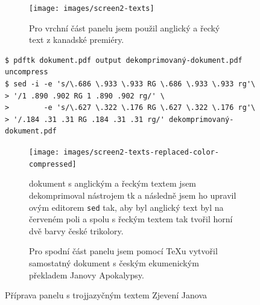 \begin{figure}[p]
\begin{subfigure}{\linewidth}
\centering
\texttt{[image: images/screen2-texts]}
\caption{Pro vrchní část panelu jsem použil anglický a řecký text z kanadské premiéry.~\cite{morland2018fantasia}}
\label{fig:screen2-texts-greek-and-english-original}
\end{subfigure}
\par\vspace{5pt}
\begingroup
\small
\begin{verbatim}
$ pdftk dokument.pdf output dekomprimovaný-dokument.pdf uncompress
$ sed -i -e 's/\.686 \.933 \.933 RG \.686 \.933 \.933 rg'\
> '/1 .890 .902 RG 1 .890 .902 rg/' \
>        -e 's/\.627 \.322 \.176 RG \.627 \.322 \.176 rg'\
> '/.184 .31 .31 RG .184 .31 .31 rg/' dekomprimovaný-dokument.pdf
\end{verbatim}
\endgroup
\par\vspace{2.5pt}
\begin{subfigure}{\linewidth}
\centering
\texttt{[image: images/screen2-texts-replaced-color-compressed]}
\caption{ dokument s anglickým a řeckým textem jsem dekomprimoval nástrojem \acro{PDF}tk a následně jsem ho upravil ovým editorem \texttt{sed} tak, aby byl anglický text byl na červeném poli a spolu s řeckým textem tak tvořil horní dvě barvy české trikolory.}
\label{fig:screen2-texts-greek-and-english-updated}
\end{subfigure}
\par\vspace{10pt}
\begin{subfigure}{\linewidth}
\centering
{}
\caption{Pro spodní část panelu jsem pomocí \TeX u vytvořil samostatný dokument s českým ekumenickým překladem Janovy Apokalypsy.}
\label{fig:screen2-texts-czech}
\end{subfigure}
\caption{Příprava panelu s trojjazyčným textem Zjevení Janova}
\label{fig:screen2-texts}
\end{figure}